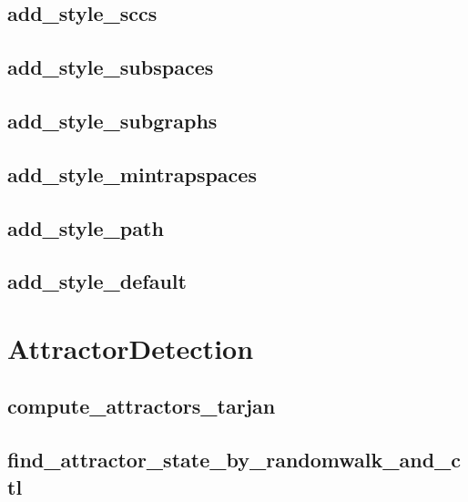 \documentclass[letterpaper,10pt,english]{sphinxmanual}
\begin{document}
\subsection{add\_style\_sccs}
\label{StateTransitionGraphs:add-style-sccs}\label{StateTransitionGraphs:id20}

\subsection{add\_style\_subspaces}
\label{StateTransitionGraphs:id21}\label{StateTransitionGraphs:add-style-subspaces}

\subsection{add\_style\_subgraphs}
\label{StateTransitionGraphs:add-style-subgraphs}\label{StateTransitionGraphs:id22}

\subsection{add\_style\_mintrapspaces}
\label{StateTransitionGraphs:id23}\label{StateTransitionGraphs:add-style-mintrapspaces}

\subsection{add\_style\_path}
\label{StateTransitionGraphs:add-style-path}\label{StateTransitionGraphs:id24}

\subsection{add\_style\_default}
\label{StateTransitionGraphs:add-style-default}\label{StateTransitionGraphs:id25}

\section{AttractorDetection}
\label{AttractorDetection:attractordetection}\label{AttractorDetection::doc}\label{AttractorDetection:id1}

\subsection{compute\_attractors\_tarjan}
\label{AttractorDetection:id2}\label{AttractorDetection:compute-attractors-tarjan}

\subsection{find\_attractor\_state\_by\_randomwalk\_and\_ctl}
\label{AttractorDetection:find-attractor-state-by-randomwalk-and-ctl}\label{AttractorDetection:id3}
\end{document}
